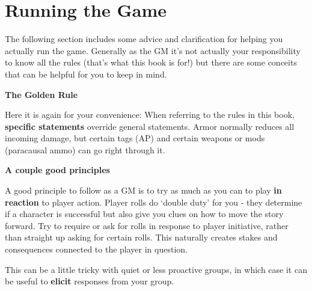 \section{Running the Game}

The following section includes some advice and clarification for helping you actually run the
game. Generally as the GM it’s not actually your responsibility to know all the rules (that’s what
this book is for!) but there are some conceits that can be helpful for you to keep in mind.

\begin{center}
    \textbf{The Golden Rule}
\end{center}

Here it is again for your convenience: When referring to the rules in this book, \textbf{specific
statements} override general statements. Armor normally reduces all incoming damage, but
certain tags (AP) and certain weapons or mods (paracausal ammo) can go right through it.

\begin{center}
\textbf{A couple good principles}
\end{center}
                                       
A good principle to follow as a GM is to try as much as you can to play \textbf{in reaction} to player
action. Player rolls do ‘double duty’ for you - they determine if a character is successful but also
give you clues on how to move the story forward. Try to require or ask for rolls in response to
player initiative, rather than straight up asking for certain rolls. This naturally creates stakes and
consequences connected to the player in question.

This can be a little tricky with quiet or less proactive groups, in which case it can be useful to
\textbf{elicit} responses from your group.

